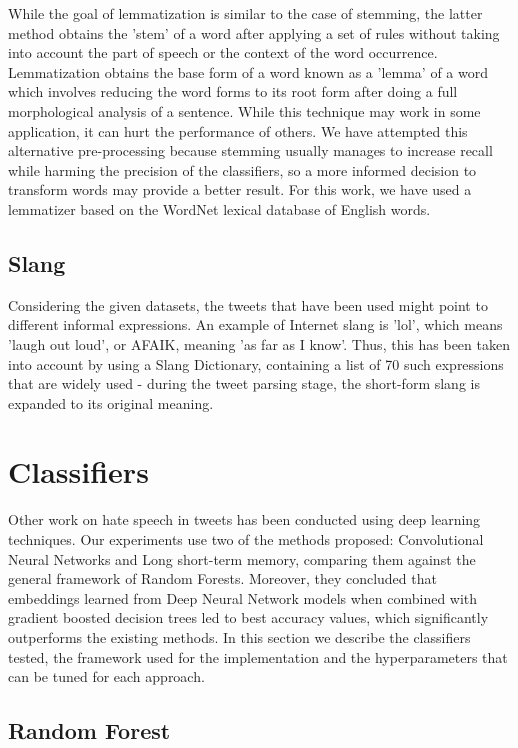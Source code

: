 \documentclass[11pt,a4paper]{article}
\begin{document}
While the goal of lemmatization is similar to the case of stemming, the latter method obtains the 'stem' of a word after applying a set of rules without taking into account the part of speech or the context of the word occurrence. Lemmatization obtains the base form of a word known as a 'lemma' of a word which involves reducing the word forms to its root form after doing a full morphological analysis of a sentence. While this technique may work in some application, it can hurt the performance of others. We have attempted this alternative pre-processing because stemming usually manages to increase recall while harming the precision of the classifiers, so a more informed decision to transform words may provide a better result. For this work, we have used a lemmatizer based on the WordNet lexical database of English words.

\subsection{Slang}

Considering the given datasets, the tweets that have been used might point to different informal expressions. An example of Internet slang is 'lol', which means 'laugh out loud', or AFAIK, meaning 'as far as I know'. Thus, this has been taken into account by using a Slang Dictionary, containing a list of 70 such expressions that are widely used - during the tweet parsing stage, the short-form slang is expanded to its original meaning.

\section{Classifiers}

Other work on hate speech in tweets \cite{Badjatiya, Pit} has been conducted using deep learning techniques. Our experiments use two of the methods proposed: Convolutional Neural Networks and Long short-term memory, comparing them against the general framework of Random Forests. Moreover, they concluded that embeddings learned from Deep Neural Network models when combined with gradient boosted decision trees led to best accuracy values, which significantly outperforms the existing methods. In this section we describe the classifiers tested, the framework used for the implementation and the hyperparameters that can be tuned for each approach.

\subsection{Random Forest}
\end{document}
